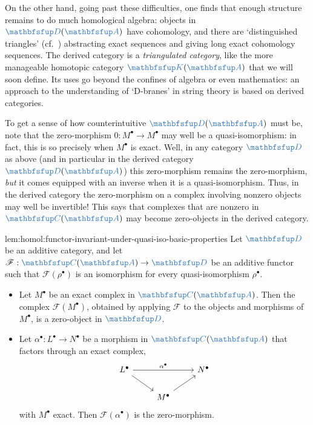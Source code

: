 On the other hand, going past these difficulties, one finds that
enough structure remains to do much homological algebra: objects in
$\categ{D}(\categ{A})$ have cohomology, and there are `distinguished
triangles' (cf.\ ) abstracting exact
sequences and giving long exact cohomology sequences. The derived
category is a \emph{triangulated category}, like the more manageable
homotopic category $\categ{K}(\categ{A})$ that we will soon
define. Its uses go beyond the confines of algebra or even
mathematics: an approach to the understanding of `D-branes' in string
theory is based on derived categories.

To get a sense of how counterintuitive $\categ{D}(\categ{A})$ must be,
note that the zero-morphism $0 : M^\bullet \to M^\bullet$ may well be
a quasi-isomorphism: in fact, this is so precisely when $M^\bullet$ is
exact. Well, in any category $\categ{D}$ as above (and in particular
in the derived category $\categ{D}(\categ{A})$) this zero-morphism
remains the zero-morphism, \emph{but} it comes equipped with an
inverse when it is a quasi-isomorphism. Thus, in the derived category
the zero-morphism on a complex involving nonzero objects may well be
invertible! This says that complexes that are nonzero in
$\categ{C}(\categ{A})$ may become zero-objects in the derived
category.

\begin{lem}{}{lem:homol:functor-invariant-under-quasi-iso-basic-properties}
  Let $\categ{D}$ be an additive category, and let
  $\mathscr{F} : \categ{C}(\categ{A}) \to \categ{D}$ be an additive
  functor such that $\mathscr{F}(\rho^\bullet)$ is an isomorphism for
  every quasi-isomorphism $\rho^\bullet$.
  \begin{itemize}
  \item Let $M^\bullet$ be an exact complex in $\categ{C}(\categ{A})$.
    Then the complex $\mathscr{F}(M^\bullet)$, obtained by applying
    $\mathscr{F}$ to the objects and morphisms of $M^\bullet$, is a
    zero-object in $\categ{D}$.
  \item Let $\alpha^\bullet : L^\bullet \to N^\bullet$ be a morphism
    in $\categ{C}(\categ{A})$ that factors through an exact complex,
    \[\begin{tikzcd}
        L^\bullet \arrow[rr, "\alpha^\bullet"] \arrow[dr] & & N^\bullet \\
        & M^\bullet \arrow[ur]
      \end{tikzcd}\] with $M^\bullet$ exact. Then
    $\mathscr{F}(\alpha^\bullet)$ is the zero-morphism.
  \end{itemize}
\end{lem}

